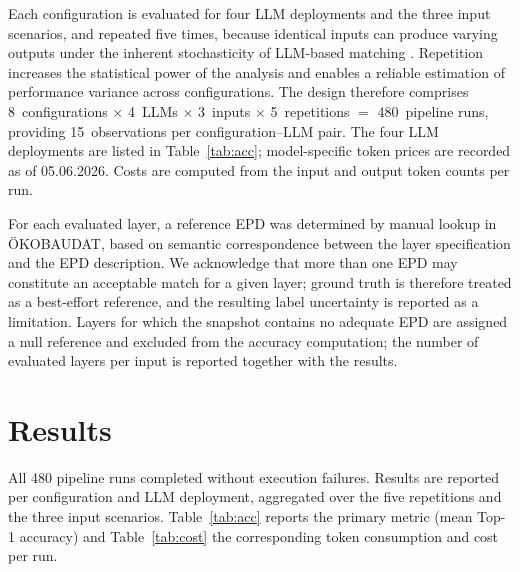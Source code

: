 \documentclass[10pt, a4paper, twocolumn]{article}
\begin{document}
Each configuration is evaluated for four LLM deployments and the three input scenarios,
and repeated five times, because identical inputs can produce varying outputs under the
inherent stochasticity of LLM-based matching \cite{Fostiropoulos.2023}. Repetition
increases the statistical power of the analysis and enables a reliable estimation of
performance variance across configurations. The design therefore comprises
8~configurations $\times$ 4~LLMs $\times$ 3~inputs $\times$ 5~repetitions $=$
480~pipeline runs, providing 15~observations per configuration--LLM pair. The four LLM deployments are listed in Table~\ref{tab:acc}; 
model-specific token prices are recorded as of 05.06.2026\@.
Costs are computed from the input and output token counts per run.

For each evaluated layer, a reference EPD was determined by manual lookup in
\"OKOBAUDAT, based on semantic correspondence between the layer specification and the
EPD description. We acknowledge that more than one EPD may constitute an acceptable
match for a given layer; ground truth is therefore treated as a best-effort reference,
and the resulting label uncertainty is reported as a limitation. 
Layers for which the snapshot contains no adequate EPD are assigned a null reference and
excluded from the accuracy computation; the number of evaluated layers per input is
reported together with the results.


\section{Results}
    \label{results}

All 480 pipeline runs completed without execution failures. Results are reported per
configuration and LLM deployment, aggregated over the five repetitions and the three
input scenarios. Table~\ref{tab:acc} reports the primary metric (mean Top-1 accuracy)
and Table~\ref{tab:cost} the corresponding token consumption and cost per run.
\end{document}
